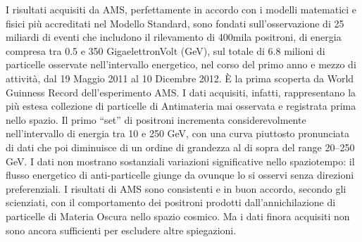 \documentclass[12pt,a4paper]{article}
\begin{document}
I risultati acquisiti da AMS, perfettamente in accordo con i modelli matematici e fisici più accreditati nel Modello Standard, sono fondati sull’osservazione di 25 miliardi di eventi che includono il rilevamento di 400mila positroni, di energia compresa tra 0.5 e 350 GigaelettronVolt (GeV), sul totale di 6.8 milioni di particelle osservate nell’intervallo energetico, nel corso del primo anno e mezzo di attività, dal 19 Maggio 2011 al 10 Dicembre 2012. È la prima scoperta da World Guinness Record dell’esperimento AMS. I dati acquisiti, infatti, rappresentano la più estesa collezione di particelle di Antimateria mai osservata e registrata prima nello spazio. Il primo “set” di positroni incrementa considerevolmente nell’intervallo di energia tra 10 e 250 GeV, con una curva piuttosto pronunciata di dati che poi diminuisce di un ordine di grandezza al di sopra del range 20--250 GeV. I dati non mostrano sostanziali variazioni significative nello spaziotempo: il flusso energetico di anti-particelle giunge da ovunque lo si osservi senza direzioni preferenziali. I risultati di AMS sono consistenti e in buon accordo, secondo gli scienziati, con il comportamento dei positroni prodotti dall’annichilazione di particelle di Materia Oscura nello spazio cosmico. Ma i dati finora acquisiti non sono ancora sufficienti per escludere altre spiegazioni.
\end{document}
